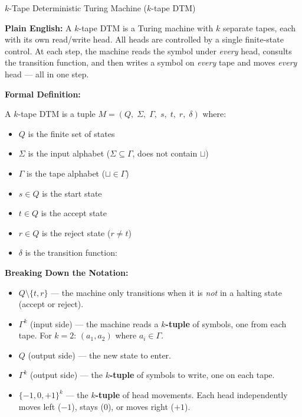 \begin{definitionbox}{$k$-Tape Deterministic Turing Machine ($k$-tape DTM)}

\textbf{Plain English:}
A $k$-tape DTM is a Turing machine with $k$ separate tapes, each with its own read/write head. All heads are controlled by a single finite-state control. At each step, the machine reads the symbol under \textit{every} head, consults the transition function, and then writes a symbol on \textit{every} tape and moves \textit{every} head --- all in one step.

\textbf{Formal Definition:}

A $k$-tape DTM is a tuple $M = (Q,\;\Sigma,\;\Gamma,\;s,\;t,\;r,\;\delta)$ where:
\begin{itemize}[nosep]
\item $Q$ is the finite set of states
\item $\Sigma$ is the input alphabet ($\Sigma \subseteq \Gamma$, does not contain $\sqcup$)
\item $\Gamma$ is the tape alphabet ($\sqcup \in \Gamma$)
\item $s \in Q$ is the start state
\item $t \in Q$ is the accept state
\item $r \in Q$ is the reject state ($r \neq t$)
\item $\delta$ is the transition function:
\end{itemize}


\textbf{Breaking Down the Notation:}
\begin{itemize}[nosep]
\item $Q \setminus \{t,r\}$ --- the machine only transitions when it is \textit{not} in a halting state (accept or reject).
\item $\Gamma^k$ (input side) --- the machine reads a \textbf{$k$-tuple} of symbols, one from each tape. For $k = 2$: $(a_1, a_2)$ where $a_i \in \Gamma$.
\item $Q$ (output side) --- the new state to enter.
\item $\Gamma^k$ (output side) --- the \textbf{$k$-tuple} of symbols to write, one on each tape.
\item $\{-1, 0, +1\}^k$ --- the \textbf{$k$-tuple} of head movements. Each head independently moves left ($-1$), stays ($0$), or moves right ($+1$).
\end{itemize}


\end{definitionbox}
